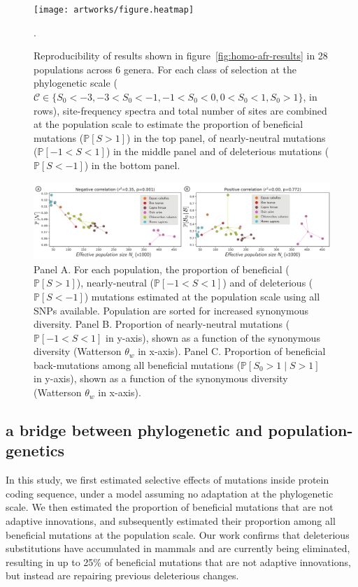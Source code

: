 \documentclass{article}
\newcommand{\proba}{\mathbb{P}}
\newcommand{\Sphy}{S_{0}}
\newcommand{\Sphyclass}{\mathcal{C}}
\newcommand{\divStrongDel}{\Sphy < -3}
\newcommand{\divDel}{-3 < \Sphy < -1}
\newcommand{\divWeakDel}{-1 < \Sphy < 0}
\newcommand{\divWeakAdv}{0 < \Sphy < 1}
\newcommand{\divAdv}{ \Sphy > 1}
\newcommand{\given}{\mid}
\newcommand{\Spop}{S}
\newcommand{\polyDel}{\Spop < -1}
\newcommand{\polyNeutral}{-1 < \Spop < 1}
\newcommand{\polyAdv}{ \Spop > 1}
\newcommand{\PpolyDel}{\proba \left[ \polyDel \right]}
\newcommand{\PpolyNeutral}{\proba \left[ \polyNeutral \right]}
\newcommand{\PpolyAdv}{\proba \left[ \polyAdv \right]}
\begin{document}
    \begin{figure}[!ht]
        \centering
        \texttt{[image: artworks/figure.heatmap]}
        \caption{
            Reproducibility of results shown in figure~\ref{fig:homo-afr-results} in 28 populations across 6 genera.
            For each class of selection at the phylogenetic scale ($\Sphyclass \in \{ \divStrongDel, \divDel,  \divWeakDel,  \divWeakAdv, \divAdv \}$, in rows), site-frequency spectra and total number of sites are combined at the population scale to estimate the proportion of beneficial mutations ($\PpolyAdv$) in the top panel, of nearly-neutral mutations ($\PpolyNeutral$) in the middle panel and of deleterious mutations ($\PpolyDel$) in the bottom panel.
        }.
        \label{fig:heatmap}
    \end{figure}

    \begin{figure}[!ht]
        \centering
        \includegraphics[width=\textwidth, page=1] {artworks/figure.diversity}
        \caption{
            Panel A. For each population, the proportion of beneficial ($\PpolyAdv$), nearly-neutral ($\PpolyNeutral$) and of deleterious ($\PpolyDel$) mutations estimated at the population scale using all SNPs available.
            Population are sorted for increased synonymous diversity.
            Panel B. Proportion of nearly-neutral mutations ($\mathbb{P} [ -1 < \Spop < 1]$ in y-axis), shown as a function of the synonymous diversity (Watterson $\theta_w$ in x-axis).
            Panel C. Proportion of beneficial back-mutations among all beneficial mutations ($\mathbb{P} [ \Sphy > 1  \given  \Spop > 1]$ in y-axis), shown as a function of the synonymous diversity (Watterson $\theta_w$ in x-axis).
        }
        \label{fig:diversity}
    \end{figure}

    \subsection*{a bridge between phylogenetic and population-genetics}
    In this study, we first estimated selective effects of mutations inside protein coding sequence, under a model assuming no adaptation at the phylogenetic scale.
    We then estimated the proportion of beneficial mutations that are not adaptive innovations, and subsequently estimated their proportion among all beneficial mutations at the population scale.
    Our work confirms that deleterious substitutions have accumulated in mammals and are currently being eliminated, resulting in up to 25\% of beneficial mutations that are not adaptive innovations, but instead are repairing previous deleterious changes.
\end{document}
